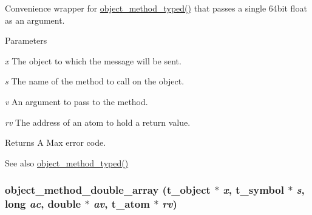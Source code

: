 Convenience wrapper for \hyperlink{group__obj_ga443dee482af22e0fe83e68955d367226}{object\_\-method\_\-typed()} that passes a single 64bit float as an argument. 
\begin{DoxyParams}{Parameters}
\item[{\em x}]The object to which the message will be sent. \item[{\em s}]The name of the method to call on the object. \item[{\em v}]An argument to pass to the method. \item[{\em rv}]The address of an atom to hold a return value.\end{DoxyParams}
\begin{DoxyReturn}{Returns}
A Max error code. 
\end{DoxyReturn}
\begin{DoxySeeAlso}{See also}
\hyperlink{group__obj_ga443dee482af22e0fe83e68955d367226}{object\_\-method\_\-typed()} 
\end{DoxySeeAlso}
\hypertarget{group__obj_gaaa262193055c44fff144e3395443597a}{
\subsubsection[{object\_\-method\_\-double\_\-array}]{ object\_\-method\_\-double\_\-array ({\bf t\_\-object} $\ast$ {\em x}, \/  {\bf t\_\-symbol} $\ast$ {\em s}, \/  long {\em ac}, \/  double $\ast$ {\em av}, \/  {\bf t\_\-atom} $\ast$ {\em rv})}}
\label{group__obj_gaaa262193055c44fff144e3395443597a}


